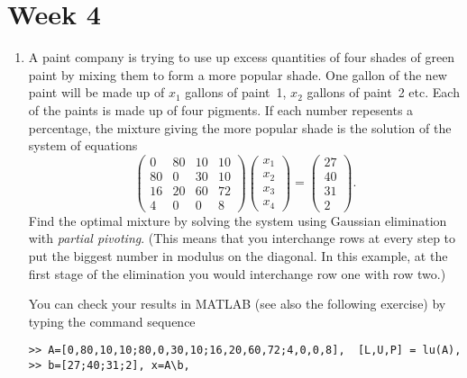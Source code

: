 \documentclass[11pt,a4paper]{article}
\begin{document}


\section*{Week 4}

\begin{enumerate}


\item\label{qdjsx3}
A paint company is trying to use up excess quantities of four shades
of green paint by mixing them to form a more popular shade. One gallon
of the new paint will be made up of $x_1$ gallons of paint~1, $x_2$
gallons of paint~2 etc. Each of the paints is made up of four
pigments. If each number repesents a percentage, 
the mixture giving the more popular shade is the solution of 
the system of equations
$$\left ( \begin{array}{rrrr}
         0 & 80 & 10 & 10 \\
        80 &  0 & 30 & 10 \\
        16 & 20 & 60 & 72 \\
         4 &  0 &  0 &  8 \end{array} \right )
   \left ( \begin{array}{c}
        x_1 \\ x_2 \\ x_3 \\ x_4 
            \end{array} \right) =
   \left ( \begin{array}{r}
        27 \\ 40 \\ 31 \\ 2 
            \end{array} \right) .$$
Find the optimal mixture by solving the system using Gaussian elimination 
with {\it partial pivoting}. (This means that you interchange rows at every step
to put the biggest number in modulus  on the diagonal. In this example,
 at the first stage of the elimination you would interchange row one with row two.)


You can check your results   in MATLAB (see also the following  exercise) by typing the command sequence
\begin{verbatim}
>> A=[0,80,10,10;80,0,30,10;16,20,60,72;4,0,0,8],  [L,U,P] = lu(A),
>> b=[27;40;31;2], x=A\b, 
\end{verbatim}



\end{enumerate}
\end{document}
